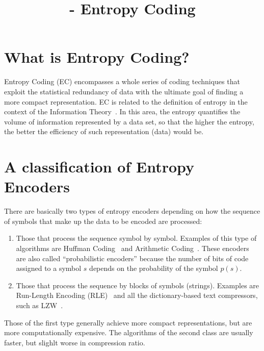 


\title{\SM{} - Entropy Coding}

\maketitle

\tableofcontents

\section{What is Entropy Coding?}

Entropy Coding (EC) encompasses a whole series of coding techniques
that exploit the statistical redundancy of data with the ultimate goal
of finding a more compact representation. EC is related to the
definition of entropy in the context of the Information
Theory~\cite{vruiz__information_theory}. In this area, the entropy
quantifies the volume of information represented by a data set, so
that the higher the entropy, the better the efficiency of such
representation (data) would be.

\section{A classification of Entropy Encoders}

There are basically two types of entropy encoders depending on how the
sequence of symbols that make up the data to be encoded are processed:

\begin{enumerate}
\item Those that process the sequence symbol by symbol. Examples of
  this type of algorithms are Huffman
  Coding~\cite{vruiz__huffman_coding} and Arithmetic
  Coding~\cite{vruiz__arithmetic_coding}. These encoders are also
  called ``probabilistic encoders'' because the number of bits of code
  assigned to a symbol $s$ depends on the probability of the symbol
  $p(s)$.
\item Those that process the sequence by blocks of symbols
  (strings). Examples are Run-Length Encoding (RLE)~\cite{vruiz__rle}
  and all the dictionary-based text compressors, such as
  LZW~\cite{vruiz__LZW}.
\end{enumerate}
  
Those of the first type generally achieve more compact
representations, but are more computationally expensive. The
algorithms of the second class are usually faster, but slighlt worse
in compression ratio.

